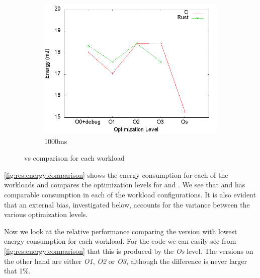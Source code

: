 \begin{figure}[H]
  \begin{subfigure}{0.49\textwidth}
    \includegraphics[width=\textwidth]{results/plots/energy/1000.png}
    \caption{1000ms}
    \label{}
  \end{subfigure}

  \caption{{\rust} vs {\C} comparison for each workload}
  \label{fig:res:energy:comparison}
\end{figure}

\autoref{fig:res:energy:comparison} shows the energy consumption for each of the workloads and compares the optimization levels for {\rust} and {\C}.
We see that {\rust} and {\C} has comparable consumption in each of the workload configurations.
It is also evident that an external bias, investigated below, accounts for the variance between the various optimization levels.

Now we look at the relative performance comparing the version with lowest energy consumption for each workload.
For the {\C} code we can easily see from \autoref{fig:res:energy:comparison} that this is produced by the \emph{Os} level.
The {\rust} versions on the other hand are either \emph{O1}, \emph{O2} or \emph{O3}, although the difference is never larger that 1\%.

